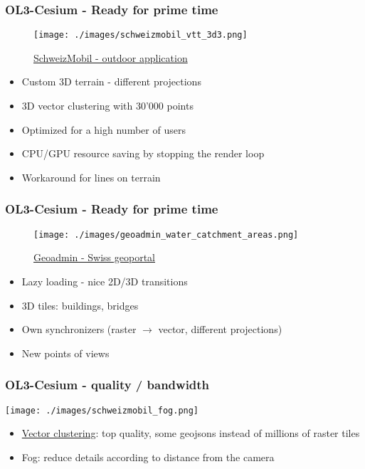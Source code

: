 \documentclass[handout]{beamer}
\begin{document}
  \begin{frame}
    \frametitle{OL3-Cesium - Ready for prime time}
    \begin{figure}
    \begin{center}
      \texttt{[image: ./images/schweizmobil\_vtt\_3d3.png]}
    \end{center}
    \href {https://map.schweizmobil.ch/?cesium&trackId=2149217&lang=fr&bgLayer=lb&resolution=10.86&X=561417&Y=141893&layers=Bus\%2CWanderland}{SchweizMobil - outdoor application}
    \end{figure}

    \begin{itemize}
      \pause\item Custom 3D terrain - different projections
      \pause\item 3D vector clustering with 30'000 points
      \pause\item Optimized for a high number of users
      \pause\item CPU/GPU resource saving by stopping the render loop
      \pause\item Workaround for lines on terrain
     \end{itemize}
  \end{frame}

  \begin{frame}
    \frametitle{OL3-Cesium - Ready for prime time}
    \begin{figure}
    \begin{center}
      \texttt{[image: ./images/geoadmin\_water\_catchment\_areas.png]}
    \end{center}
    \href {https://map.geo.admin.ch}{Geoadmin - Swiss geoportal}
    \end{figure}

    \begin{itemize}
      \pause\item Lazy loading - nice 2D/3D transitions
      \pause\item 3D tiles: buildings, bridges
      \pause\item Own synchronizers (raster $\rightarrow$ vector, different projections)
      \pause\item New points of views
    \end{itemize}
  \end{frame}


  \begin{frame}
    \frametitle{OL3-Cesium - quality / bandwidth}
    \begin{center}
      \texttt{[image: ./images/schweizmobil\_fog.png]}
    \end{center}

    \begin{itemize}
     \pause\item \href {https://github.com/gberaudo/ol3-cluster-tool}{Vector clustering}: top quality, some geojsons instead of millions of raster tiles
     \pause\item Fog: reduce details according to distance from the camera
    \end{itemize}
  \end{frame}
\end{document}
